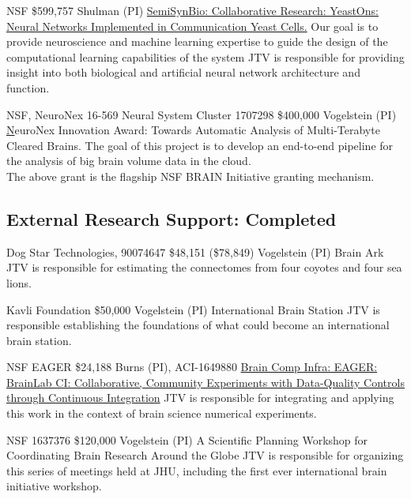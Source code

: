 \documentclass[10pt,colorlinks=true,urlcolor=blue]{moderncv}
\begin{document}
    {NSF}%
    {\$599,757}%
    {Shulman (PI)}
    {\href{http://grantome.com/grant/NSF/MCB-1807546}%
    {SemiSynBio: Collaborative Research: YeastOns: Neural Networks Implemented in Communication Yeast Cells.}
    Our goal is to provide neuroscience and machine learning expertise to guide the design of the computational learning capabilities of the system}%
    {JTV is responsible for providing insight into both biological and artificial neural network architecture and function.}
    {}

    {NSF, NeuroNex 16-569 Neural System Cluster 1707298}%
    {\$400,000}
    {Vogelstein (PI)}
    {\href{https://www.nsf.gov/awardsearch/showAward?AWD_ID=1707298}%
    NeuroNex Innovation Award: Towards Automatic Analysis of Multi-Terabyte Cleared Brains.}%
    {The goal of this project is to develop an end-to-end pipeline for
    the analysis of big brain volume data in the cloud.\\
    The above grant is the flagship NSF BRAIN Initiative granting
    mechanism.}{}

\subsection{External Research Support: Completed}

    {Dog Star Technologies, 90074647}
    {\$48,151 (\$78,849)}
    {Vogelstein (PI)}
    {Brain Ark}
    {JTV is responsible for estimating the connectomes from four coyotes and four sea lions.}
    {}


    {Kavli Foundation}
    {\$50,000}
    {Vogelstein (PI)}    
    {International Brain Station}
    {JTV is responsible establishing the foundations of what could become an international brain station.}
    {}


    {NSF EAGER}
    {\$24,188}
    {Burns (PI), ACI-1649880}    
    {\href{https://nsf.gov/awardsearch/showAward?AWD_ID=1649880&HistoricalAwards=false}%
    {Brain Comp Infra: EAGER: BrainLab CI: Collaborative, Community Experiments with Data-Quality     Controls through Continuous Integration}}
    {JTV is responsible for integrating and applying this work in the context of brain science numerical experiments.}
    {}


    {NSF 1637376}
    {\$120,000}
    {Vogelstein (PI)}    
    {%
    A Scientific Planning Workshop for Coordinating Brain Research Around the Globe}
    {JTV is responsible for organizing this series of meetings held at JHU, including the first ever international brain initiative workshop.}
    {}
\end{document}
